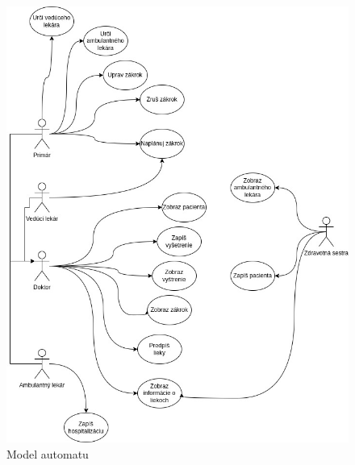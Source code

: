 \begin{figure}[h]
    \centering
    \includegraphics[width = \textwidth]{src/img/Nemocnica_use-case_Diagram.jpg}
    \caption{Model automatu}
    \label{fig:use_case}
\end{figure}
